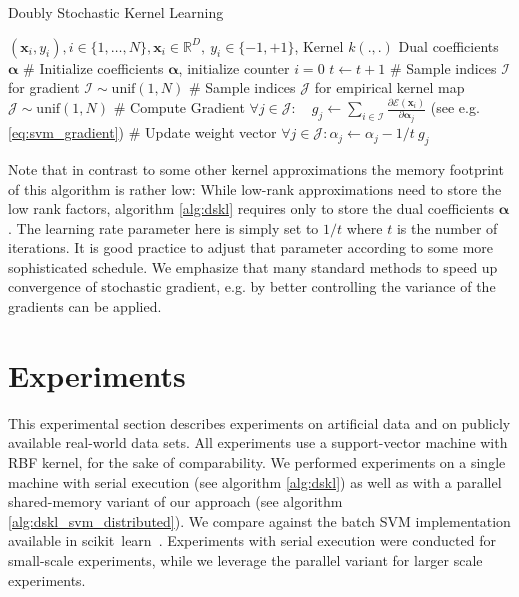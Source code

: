 \documentclass{article} %
\newcommand{\R}{\ensuremath{\mathds{R}}}
\newcommand{\va}{\boldsymbol{\alpha}}
\newcommand{\Bx}{\mathbf{x}}
\renewcommand{\vec}[1]{\mathbf{#1}}
\begin{document}
% 
\begin{algorithm}
  \begin{algorithmic}
    \caption{Doubly Stochastic Kernel Learning\label{alg:dskl}}
     \REQUIRE $(\Bx_i,y_i),i\in\{1,\dots,N\},\Bx_i\in\R^{D},~y_i\in\{-1,+1\}$, Kernel $k(.,.)$
    \ENSURE Dual coefficients $\va$ 
   \STATE \# Initialize coefficients $\va$, initialize counter $i=0$
   \STATE $t\gets t+1$
   \STATE \# Sample indices $\mathcal{I}$ for gradient 
   \STATE $\mathcal{I}\sim\text{unif}(1,N)$
   \STATE \# Sample indices $\mathcal{J}$ for empirical kernel map
   \STATE $\mathcal{J}\sim\text{unif}(1,N)$
   \STATE \# Compute Gradient
   \STATE $\forall j \in \mathcal{J}: \quad g_{j} \gets \sum_{i\in\mathcal{I}}\frac{\partial \mathcal{E}(\vec{x}_i)}{\partial\va_{j}}$  (see e.g. \autoref{eq:svm_gradient})
   \STATE \# Update weight vector 
   \STATE $\forall j\in\mathcal{J}: \alpha_j\gets\alpha_j - 1/t~ g_j$ 
   \ENDWHILE
  \end{algorithmic}
\end{algorithm}
%
Note that in contrast to some other kernel approximations the memory footprint of this algorithm is rather low: While low-rank approximations need to store the low rank factors, algorithm \autoref{alg:dskl} requires only to store the dual coefficients $\va$. 
The learning rate parameter here is simply set to $1/t$ where $t$ is the number of iterations. It is good practice to adjust that parameter according to some more sophisticated schedule. We emphasize that many standard methods to speed up convergence of stochastic gradient, e.g. by better controlling the variance of the gradients can be applied.
%
\section{Experiments}\label{sec:experiments}
This experimental section describes experiments on artificial data and on publicly available real-world data sets. All experiments use a support-vector machine with RBF kernel, for the sake of comparability. We performed experiments on a single machine with serial execution (see algorithm \autoref{alg:dskl}) as well as with a parallel shared-memory variant of our approach (see algorithm \autoref{alg:dskl_svm_distributed}). We compare against the batch SVM implementation available in scikit~learn~\cite{sklearn_api}. Experiments with serial execution were conducted for small-scale experiments, while we leverage the parallel variant for larger scale experiments. 
\end{document}
